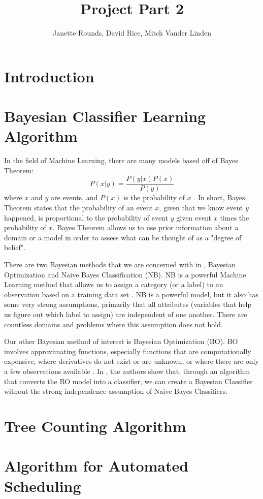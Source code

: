 \documentclass[]{article}
\title{Project Part 2}
\author{Janette Rounds, David Rice, Mitch Vander Linden}
\begin{document}
\maketitle

\section{Introduction}

\section{Bayesian Classifier Learning Algorithm}
In the field of Machine Learning, there are many models based off of Bayes Theorem: 
$$P(x|y) = \frac{P(y|x)P(x)}{P(y)}$$ where $x$ and $y$ are events, and $P(x)$ is the probability of $x$ \cite{koller2009probabilistic}.  In short, Bayes Theorem states that the probability of an event $x$, given that we know event $y$ happened, is proportional to the probability of event $y$ given event $x$ times the probability of $x$. Bayes Theorem allows us to use prior information about a domain or a model in order to assess what can be thought of as a "degree of belief". 

There are two Bayesian methods that we are concerned with in \cite[Liu 2013]{liu2013bayesian}, Bayesian Optimization and Naive Bayes Classification (NB).  NB is a powerful Machine Learning method that allows us to assign a category (or a label) to an observation based on a training data set \cite{koller2009probabilistic}. NB is a powerful model, but it also has some very strong assumptions, primarily that all attributes (variables that help us figure out which label to assign) are independent of one another. There are countless domains and problems where this assumption does not hold. 

Our other Bayesian method of interest is Bayesian Optimization (BO). BO involves approximating functions, especially functions that are computationally expensive, where derivatives do not exist or are unknown, or where there are only a few observations available \cite{brochu2010tutorial}. In \cite[Liu 2013]{liu2013bayesian}, the authors show that, through an algorithm that converts the BO model into a classifier, we can create a Bayesian Classifier without the strong independence assumption of Naive Bayes Classifiers. 

\section{Tree Counting Algorithm}
\cite[Santoro 2013]{santoro2013tree}
\section{Algorithm for Automated Scheduling}
\cite[Casadesus 2012]{casadesus2012drip}


\end{document}
